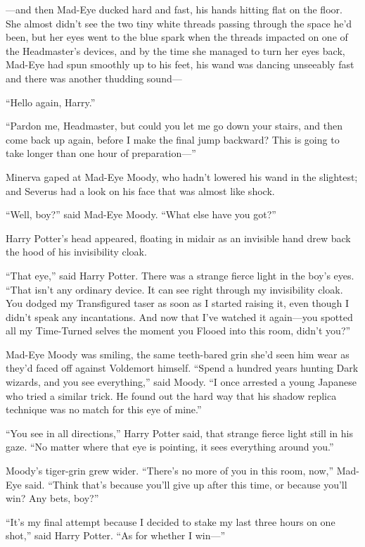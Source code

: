 ---and then Mad-Eye ducked hard and fast, his hands hitting flat on the
floor. She almost didn't see the two tiny white threads passing through
the space he'd been, but her eyes went to the blue spark when the
threads impacted on one of the Headmaster's devices, and by the time she
managed to turn her eyes back, Mad-Eye had spun smoothly up to his feet,
his wand was dancing unseeably fast and there was another thudding
sound---

``Hello again, Harry.''

``Pardon me, Headmaster, but could you let me go down your stairs, and
then come back up again, before I make the final jump backward? This is
going to take longer than one hour of preparation---''

Minerva gaped at Mad-Eye Moody, who hadn't lowered his wand in the
slightest; and Severus had a look on his face that was almost like
shock.

``Well, boy?'' said Mad-Eye Moody. ``What else have you got?''

Harry Potter's head appeared, floating in midair as an invisible hand
drew back the hood of his invisibility cloak.

``That eye,'' said Harry Potter. There was a strange fierce light in the
boy's eyes. ``That isn't any ordinary device. It can see right through
my invisibility cloak. You dodged my Transfigured taser as soon as I
started raising it, even though I didn't speak any incantations. And now
that I've watched it again---you spotted all my Time-Turned selves the
moment you Flooed into this room, didn't you?''

Mad-Eye Moody was smiling, the same teeth-bared grin she'd seen him wear
as they'd faced off against Voldemort himself. ``Spend a hundred years
hunting Dark wizards, and you see everything,'' said Moody. ``I once
arrested a young Japanese who tried a similar trick. He found out the
hard way that his shadow replica technique was no match for this eye of
mine.''

``You see in all directions,'' Harry Potter said, that strange fierce
light still in his gaze. ``No matter where that eye is pointing, it sees
everything around you.''

Moody's tiger-grin grew wider. ``There's no more of you in this room,
now,'' Mad-Eye said. ``Think that's because you'll give up after this
time, or because you'll win? Any bets, boy?''

``It's my final attempt because I decided to stake my last three hours
on one shot,'' said Harry Potter. ``As for whether I win---''

